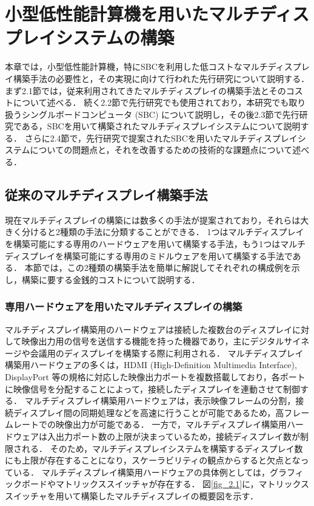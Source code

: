 \chapter{小型低性能計算機を用いたマルチディスプレイシステムの構築}

本章では，小型低性能計算機，特にSBCを利用した低コストなマルチディスプレイ構築手法の必要性と，その実現に向けて行われた先行研究について説明する．
まず2.1節では，従来利用されてきたマルチディスプレイの構築手法とそのコストについて述べる．
続く2.2節で先行研究でも使用されており，本研究でも取り扱うシングルボードコンピュータ (SBC) について説明し，その後2.3節で先行研究である，SBCを用いて構築されたマルチディスプレイシステムについて説明する．
さらに2.4節で，先行研究で提案されたSBCを用いたマルチディスプレイシステムについての問題点と，それを改善するための技術的な課題点について述べる．

\section{従来のマルチディスプレイ構築手法}
現在マルチディスプレイの構築には数多くの手法が提案されており，それらは大きく分けると2種類の手法に分類することができる\cite{pccluster,6693038}．
1つはマルチディスプレイを構築可能にする専用のハードウェアを用いて構築する手法，もう1つはマルチディスプレイを構築可能にする専用のミドルウェアを用いて構築する手法である．
本節では，この2種類の構築手法を簡単に解説してそれぞれの構成例を示し，構築に要する金銭的コストについて説明する．

\subsection{専用ハードウェアを用いたマルチディスプレイの構築}

マルチディスプレイ構築用のハードウェアは接続した複数台のディスプレイに対して映像出力用の信号を送信する機能を持った機器であり，主にデジタルサイネージ\cite{signage}や会議用のディスプレイを構築する際に利用される．
マルチディスプレイ構築用ハードウェアの多くは，HDMI (High-Definition Multimedia Interface), DisplayPort \cite{displayport}等の規格に対応した映像出力ポートを複数搭載しており，各ポートに映像信号を分配することによって，接続したディスプレイを連動させて制御する．
マルチディスプレイ構築用ハードウェアは，表示映像フレームの分割，接続ディスプレイ間の同期処理などを高速に行うことが可能であるため，高フレームレートでの映像出力が可能である．
一方で，マルチディスプレイ構築用ハードウェアは入出力ポート数の上限が決まっているため，接続ディスプレイ数が制限される．
そのため，マルチディスプレイシステムを構築するディスプレイ数にも上限が存在することになり，スケーラビリティの観点からすると欠点となっている．
マルチディスプレイ構築用ハードウェアの具体例としては，グラフィックボードやマトリックススイッチャが存在する．
図\ref{fig_2.1}に，マトリックススイッチャを用いて構築したマルチディスプレイの概要図を示す．

